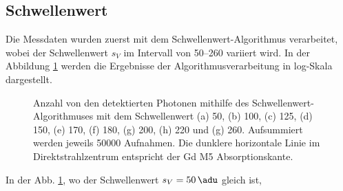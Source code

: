 \subsection{Schwellenwert}
Die Messdaten wurden zuerst mit dem Schwellenwert-Algorithmus verarbeitet, wobei der Schwellenwert $s_V$ im Intervall von \SIrange{50}{260}{\adu} variiert wird. In der Abbildung \ref{fig:th_50_100_125_150_170_180_200_220_260} werden die Ergebnisse der Algorithmusverarbeitung in log-Skala dargestellt.
\begin{figure}[H]
    \centering
    
    \caption{Anzahl von den detektierten Photonen mithilfe des Schwellenwert-Algorithmuses mit dem Schwellenwert (a) \SI{50}{\adu}, (b) \SI{100}{\adu}, (c) \SI{125}{\adu}, (d) \SI{150}{\adu}, (e) \SI{170}{\adu}, (f) \SI{180}{\adu}, (g) \SI{200}{\adu}, (h) \SI{220}{\adu} und (g) \SI{260}{\adu}. Aufsummiert werden jeweils \num{50000} Aufnahmen. Die dunklere horizontale Linie im Direktstrahlzentrum entspricht der Gd M5 Absorptionskante.}
    \label{fig:th_50_100_125_150_170_180_200_220_260}
\end{figure}
%     
\noindent
In der Abb. \ref{fig:th_50_100_125_150_170_180_200_220_260}, wo der Schwellenwert $s_V = \SI{50}{\adu}$ gleich ist, 

